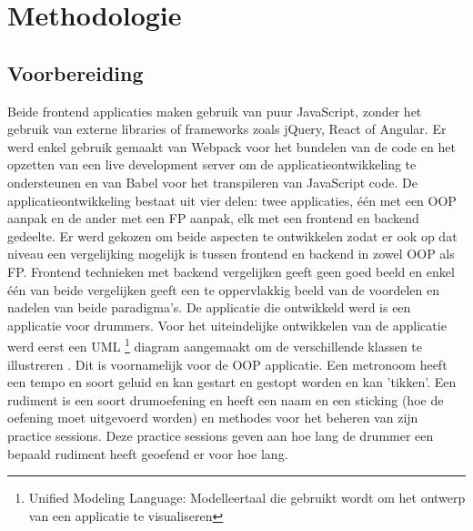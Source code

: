 
\chapter{Methodologie}
\label{ch:methodologie}


\section{Voorbereiding}
 Beide frontend applicaties maken gebruik van puur JavaScript, zonder het gebruik van externe libraries of frameworks zoals jQuery, React of Angular. Er werd enkel gebruik gemaakt van Webpack voor het bundelen van de code en het opzetten van een live development server om de applicatieontwikkeling te ondersteunen en van Babel voor het transpileren van JavaScript code. De applicatieontwikkeling bestaat uit vier delen: twee applicaties, één met een OOP aanpak en de ander met een FP aanpak, elk met een frontend en backend gedeelte. Er werd gekozen om beide aspecten te ontwikkelen zodat er ook op dat niveau een vergelijking mogelijk is tussen frontend en backend in zowel OOP als FP. Frontend technieken met backend vergelijken geeft geen goed beeld en enkel één van beide vergelijken geeft een te oppervlakkig beeld van de voordelen en nadelen van beide paradigma's. De applicatie die ontwikkeld werd is een applicatie voor drummers. Voor het uiteindelijke ontwikkelen van de applicatie werd eerst een UML \footnote{Unified Modeling Language: Modelleertaal die gebruikt wordt om het ontwerp van een applicatie te visualiseren} diagram aangemaakt om de verschillende klassen te illustreren \autocite{Booch2005}. Dit is voornamelijk voor de OOP applicatie. Een metronoom heeft een tempo en soort geluid en kan gestart en gestopt worden en kan 'tikken'. Een rudiment is een soort drumoefening en heeft een naam en een sticking (hoe de oefening moet uitgevoerd worden) en methodes voor het beheren van zijn practice sessions. Deze practice sessions geven aan hoe lang de drummer een bepaald rudiment heeft geoefend er voor hoe lang. 
 
